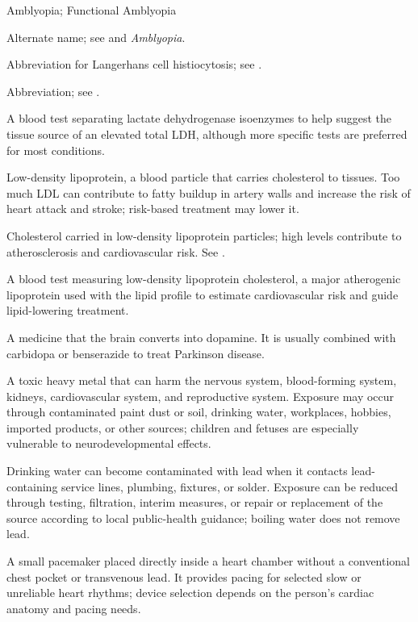 \synonyms
Amblyopia; Functional Amblyopia

 Alternate name; see  and \textit{Amblyopia}.

 Abbreviation for Langerhans cell histiocytosis; see .

 Abbreviation; see .

 A blood test separating lactate dehydrogenase isoenzymes to help suggest the tissue source of an elevated total LDH, although more specific tests are preferred for most conditions.

 Low-density lipoprotein, a blood particle that carries cholesterol to tissues. Too much LDL can contribute to fatty buildup in artery walls and increase the risk of heart attack and stroke; risk-based treatment may lower it.

 Cholesterol carried in low-density lipoprotein particles; high levels contribute to atherosclerosis and cardiovascular risk. See .

 A blood test measuring low-density lipoprotein cholesterol, a major atherogenic lipoprotein used with the lipid profile to estimate cardiovascular risk and guide lipid-lowering treatment.

 A medicine that the brain converts into dopamine. It is usually combined with carbidopa or benserazide to treat Parkinson disease.

 A toxic heavy metal that can harm the nervous system, blood-forming system, kidneys, cardiovascular system, and reproductive system. Exposure may occur through contaminated paint dust or soil, drinking water, workplaces, hobbies, imported products, or other sources; children and fetuses are especially vulnerable to neurodevelopmental effects.

 Drinking water can become contaminated with lead when it contacts lead-containing service lines, plumbing, fixtures, or solder. Exposure can be reduced through testing, filtration, interim measures, or repair or replacement of the source according to local public-health guidance; boiling water does not remove lead.

 A small pacemaker placed directly inside a heart chamber without a conventional chest pocket or transvenous lead. It provides pacing for selected slow or unreliable heart rhythms; device selection depends on the person’s cardiac anatomy and pacing needs.

